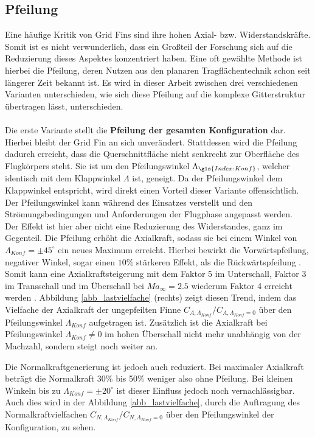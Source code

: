 \subsection{Pfeilung}
Eine häufige Kritik von Grid Fins sind ihre hohen Axial- bzw. Widerstandskräfte. Somit ist es nicht verwunderlich, dass ein Großteil der Forschung sich auf die Reduzierung dieses Aspektes konzentriert haben. Eine oft gewählte Methode ist hierbei die Pfeilung, deren Nutzen aus den planaren Tragflächentechnik schon seit längerer Zeit bekannt ist. Es wird in dieser Arbeit zwischen drei verschiedenen Varianten unterschieden, wie sich diese Pfeilung auf die komplexe Gitterstruktur übertragen lässt, unterschieden.\\
~\\
Die erste Variante stellt die \textbf{Pfeilung der gesamten Konfiguration} dar. Hierbei bleibt der Grid Fin an sich unverändert. Stattdessen wird die Pfeilung dadurch erreicht, dass die Querschnittfläche nicht senkrecht zur Oberfläche des Flugkörpers steht. Sie ist um den Pfeilungswinkel $\Lambda_{\gls{Index:Konf}}$, welcher identisch mit dem Klappwinkel $\Lambda$ ist, geneigt. Da der Pfeilungswinkel dem Klappwinkel entspricht, wird direkt einen Vorteil dieser Variante offensichtlich. Der Pfeilungswinkel kann während des Einsatzes verstellt und den Strömungsbedingungen und Anforderungen der Flugphase angepasst werden.\\
Der Effekt ist hier aber nicht eine Reduzierung des Widerstandes, ganz im Gegenteil. Die Pfeilung erhöht die Axialkraft, sodass sie bei einem Winkel von $\Lambda_{Konf} = \pm45^\circ$ ein neues Maximum erreicht. Hierbei bewirkt die Vorwärtspfeilung, negativer Winkel, sogar einen $10\%$ stärkeren Effekt, als die Rückwärtspfeilung \cite{LambdaKonf}. Somit kann eine Axialkraftsteigerung mit dem Faktor 5 im Unterschall, Faktor 3 im Transschall und im Überschall bei $Ma_\infty = 2.5$ wiederum Faktor 4 erreicht werden \cite{LambdaKonf}. Abbildung \ref{abb_lastvielfache} (rechts) zeigt diesen Trend, indem das Vielfache der Axialkraft der ungepfeilten Finne $C_{A,\Lambda_{Konf}}/C_{A,\Lambda_{Konf}=0}$ über den Pfeilungswinkel $\Lambda_{Konf}$ aufgetragen ist. Zusätzlich ist die Axialkraft bei Pfeilungswinkel $\Lambda_{Konf} \neq 0$ im hohen Überschall nicht mehr unabhängig von der Machzahl, sondern steigt noch weiter an.

Die Normalkraftgenerierung ist jedoch auch reduziert. Bei maximaler Axialkraft beträgt die Normalkraft 30\% bis 50\% weniger also ohne Pfeilung. Bei kleinen Winkeln bis zu $\Lambda_{Konf} = \pm20^\circ$ ist dieser Einfluss jedoch noch vernachlässigbar. Auch dies wird in der Abbildung \ref{abb_lastvielfache}, durch die Auftragung des Normalkraftvielfachen $C_{N,\Lambda_{Konf}}/C_{N,\Lambda_{Konf}=0}$ über den Pfeilungswinkel der Konfiguration, zu sehen.


